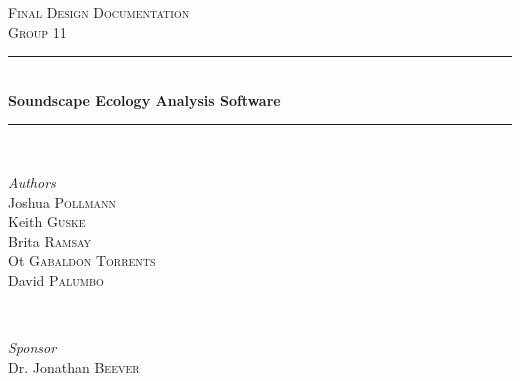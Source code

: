 \begin{titlepage} %
  \newcommand{\HRule}{\rule{\linewidth}{0.5mm}} %

  \center %


  \textsc{\LARGE Final Design Documentation}\\[1.5cm] %

  \textsc{\Large Group 11}\\[0.5cm] %



  \HRule\\[0.4cm]

  {\huge\bfseries Soundscape Ecology Analysis Software}\\[0.4cm] %

  \HRule\\[1.5cm]


  \begin{minipage}{0.4\textwidth}
    \begin{flushleft}
      \large
      \textit{Authors}\\
      Joshua \textsc{Pollmann}\\
      Keith \textsc{Guske}\\
      Brita \textsc{Ramsay}\\
      Ot \textsc{Gabaldon Torrents}\\
      David \textsc{Palumbo}\\
    \end{flushleft}
  \end{minipage}
  ~
  \begin{minipage}{0.4\textwidth}
    \begin{flushright}
      \large
      \textit{Sponsor}\\
      Dr. Jonathan \textsc{Beever} %
    \end{flushright}
  \end{minipage}


\end{titlepage}
